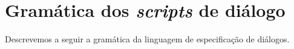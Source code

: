 \chapter{Gramática dos \emph{scripts} de
  diálogo}\label{ap:gram-script-dialogo}

Descrevemos a seguir a gramática da linguagem de especificação de diálogos.
